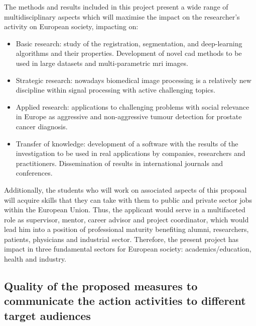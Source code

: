 The methods and results included in this project present a wide range of multidisciplinary aspects which will maximise the impact on the researcher's activity on European society, impacting on:
\begin{itemize}[noitemsep]
\item Basic research: study of the registration, segmentation, and deep-learning algorithms and their properties.
Development of novel \ac{cad} methods to be used in large datasets and multi-parametric \ac{mri} images.
\item Strategic research: nowadays biomedical image processing is a relatively new discipline within signal processing with active challenging topics.
\item Applied research: applications to challenging problems with social relevance in Europe as aggressive and non-aggressive tumour detection for prostate cancer diagnosis.
\item Transfer of knowledge: development of a software with the results of the investigation to be used in real applications by companies, researchers and practitioners.
Dissemination of results in international journals and conferences.
\end{itemize}

Additionally, the students who will work on associated aspects of this proposal will acquire skills that they can take with them to public and private sector jobs within the European Union. 
Thus, the applicant would serve in a multifaceted role as supervisor, mentor, career advisor and project coordinator, which would lead him into a position of professional maturity benefiting alumni, researchers, patients, physicians and industrial sector.
Therefore, the present project has impact in three fundamental sectors for European society: academics/education, health and industry.

\subsection{Quality of the proposed measures to communicate the action activities to different target audiences}

